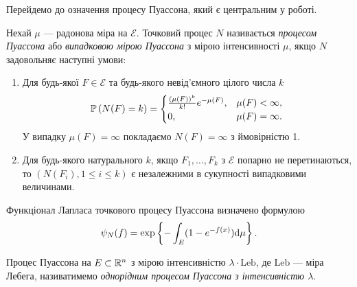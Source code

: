 Перейдемо до означення процесу Пуассона, який є центральним у роботі.
\begin{definition}\label{def:poiss_proc}
    Нехай $\mu$ --- радонова міра на $\mathcal{E}$.
    Точковий процес $N$ називається \emph{процесом Пуассона} або
    \emph{випадковою мірою Пуассона} з мірою інтенсивності $\mu$, якщо $N$ 
    задовольняє наступні умови:
    \begin{enumerate}
        \item Для будь-якої $F \in \mathcal{E}$ 
        та будь-якого невід'ємного цілого числа $k$
        \begin{gather*}
            \P{N(F) = k} = \begin{cases}
                \frac{(\mu(F))^k}{k!} e^{-\mu(F)}, & \mu(F) < \infty, \\
                0, & \mu(F) = \infty.
            \end{cases}
        \end{gather*}
        У випадку $\mu(F) = \infty$ покладаємо $N(F) = \infty$ з ймовірністю 1.
        \item Для будь-якого натурального $k$, 
        якщо $F_1, \dots, F_k$ з $\mathcal{E}$ попарно не перетинаються, то
        $\left(N(F_i), 1\leq i \leq k\right)$ є незалежними в сукупності випадковими величинами.
    \end{enumerate}
    Функціонал Лапласа точкового процесу Пуассона визначено формулою
    \begin{gather}
        \psi_N(f) = \exp\left\{ 
            - \int_E (1 - e^{-f(x)}) \d \mu
        \right\}.
    \end{gather}
\end{definition}

\begin{definition}
    Процес Пуассона на $E \subset \R^n$ з мірою інтенсивністю
    $\lambda \cdot \mathrm{Leb}$, де $\mathrm{Leb}$ --- міра Лебега, називатимемо
    \emph{однорідним процесом Пуассона з інтенсивністю $\lambda$}.
\end{definition}

